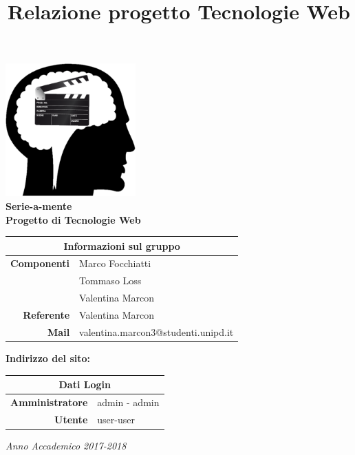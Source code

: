 \documentclass{tecweb}
\title{Relazione progetto Tecnologie Web}
\begin{document}
	\begin{titlepage}
		\begin{center}
			\includegraphics[width=5cm]{Logo2}
			\vspace{0.5cm}	\\
			\Huge \textbf{Serie-a-mente}
			\vspace{0.5cm}\\
			\normalsize \textbf{Progetto di Tecnologie Web}
			\vspace{0.7cm}	\\
			\renewcommand\arraystretch{1.3}	
			\begin{tabularx}{11cm}{r|X}
				\multicolumn{2}{c}{\textbf{Informazioni sul gruppo}}\\ 
				\hline
				\textbf{Componenti} & Marco Focchiatti \\ & Tommaso Loss \\ & Valentina Marcon \\  
				\textbf{Referente} & Valentina Marcon \\ 
				\textbf{Mail} & valentina.marcon3@studenti.unipd.it \\
			\end{tabularx}
			\vspace{0.7cm}
			\textbf{Indirizzo del sito:}
			\vspace{0.7cm}	\\
			\begin{tabularx}{11cm}{r|X}
				\multicolumn{2}{c}{\textbf{Dati Login}}\\ 
				\hline
				\textbf{Amministratore} & admin - admin \\
				\textbf{Utente} & user-user
			\end{tabularx}
		\vspace{2cm}
		\textit{Anno Accademico 2017-2018}
			
		\end{center}
	\end{titlepage}
\end{document}
